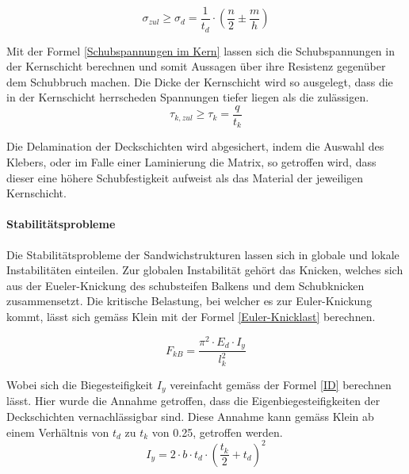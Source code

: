     \begin{equation}
      \label{Spannung in Deckschicht}
      \sigma_{zul} \geq \sigma_d = \frac{1}{t_d}\cdot \left ( \frac{n}{2} \pm \frac{m}{h}\right )
    \end{equation}

    Mit der Formel \ref{Schubspannungen im Kern} lassen sich die Schubspannungen in der Kernschicht berechnen und somit Aussagen über ihre Resistenz gegenüber dem Schubbruch machen. Die Dicke der Kernschicht wird so ausgelegt, dass die in der Kernschicht herrscheden Spannungen tiefer liegen als die zulässigen.
    \begin{equation}
      \label{Schubspannungen im Kern}
      \tau_{k,zul} \geq \tau_k = \frac{q}{t_k}
    \end{equation}

    Die Delamination der Deckschichten wird abgesichert, indem die Auswahl des Klebers, oder im Falle einer Laminierung die Matrix, so getroffen wird, dass dieser eine höhere Schubfestigkeit aufweist als das Material der jeweiligen Kernschicht.

    \paragraph{Stabilitätsprobleme}
    Die Stabilitätsprobleme der Sandwichstrukturen lassen sich in globale und lokale Instabilitäten einteilen. Zur globalen Instabilität gehört das Knicken, welches sich aus der Eueler-Knickung des schubsteifen Balkens und dem Schubknicken zusammensetzt. Die kritische Belastung, bei welcher es zur Euler-Knickung kommt, lässt sich gemäss Klein \cite{klein} mit der Formel \ref{Euler-Knicklast} berechnen.

    \begin{equation}
      \label{Euler-Knicklast}
      F_{kB}=\frac{\pi^2 \cdot E_d \cdot I_y}{l_k^{2}}
    \end{equation}

    Wobei sich die Biegesteifigkeit $I_y$ vereinfacht gemäss der Formel \ref{ID} berechnen lässt. Hier wurde die Annahme getroffen, dass die Eigenbiegesteifigkeiten der Deckschichten vernachlässigbar sind. Diese Annahme kann gemäss Klein \cite{klein} ab einem Verhältnis von $t_d$ zu $t_k$ von 0.25, getroffen werden.
    \begin{equation}
      \label{ID}
      I_y = 2 \cdot b \cdot t_d \cdot \left( \frac{t_k}{2} + t_d \right )^{2}
    \end{equation}

